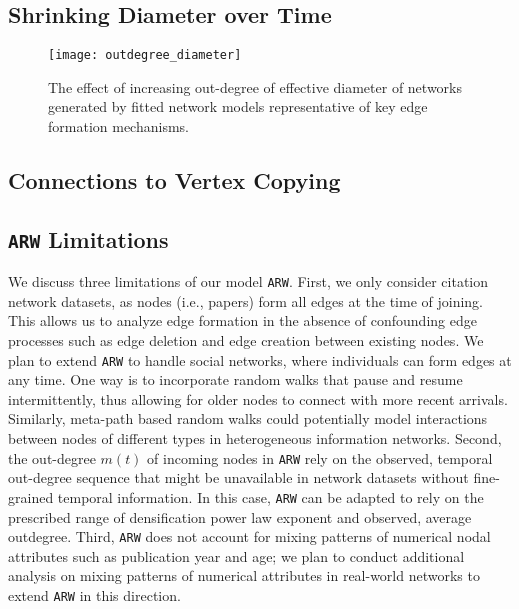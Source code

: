 \subsection{Shrinking Diameter over Time}

\begin{figure}[H]
 \vspace{-10pt}
 \centering
 \texttt{[image: outdegree\_diameter]}
 \caption{
    The effect of increasing out-degree of effective diameter of networks
    generated by fitted network models representative of key edge formation
    mechanisms.
 }
 \label{fig:diameter}
 \vspace{-10pt}
\end{figure}

\subsection{Connections to Vertex Copying}

\subsection{\texttt{ARW} Limitations}
We discuss three limitations of our model \texttt{ARW}.
First, we only consider citation network datasets, as nodes (i.e., papers) form
all edges at the time of joining. This allows us to analyze edge formation in
the absence of confounding edge processes such as edge deletion and edge
creation between existing nodes. We plan to extend \texttt{ARW} to handle social
networks, where individuals can form edges at any time. One way is to
incorporate random walks that pause and resume intermittently, thus allowing for
older nodes to connect with more recent arrivals.  Similarly, meta-path based
random walks could potentially model interactions between nodes of different
types in heterogeneous information networks.
Second, the out-degree $m(t)$ of incoming nodes in \texttt{ARW} rely on the
observed, temporal out-degree sequence that might be unavailable in network
datasets without fine-grained temporal information. In this case, \texttt{ARW}
can be adapted to rely on the prescribed range of densification power law
exponent \cite{leskovec2005graphs} and observed, average outdegree.
Third, \texttt{ARW} does not account for mixing patterns of numerical nodal attributes
such as publication year and age; we plan to conduct additional analysis on mixing
patterns of numerical attributes in real-world networks to extend \texttt{ARW} in
this direction.


